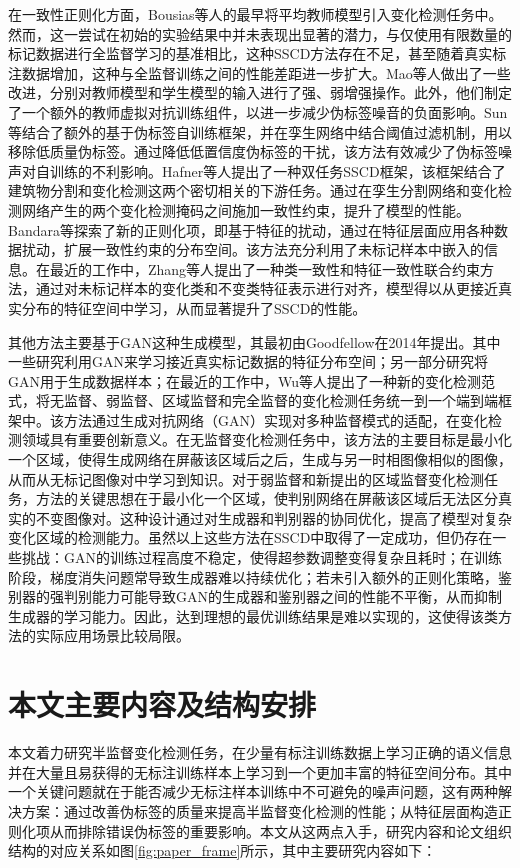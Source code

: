 \documentclass[lang=chs, degree=master, blindreview=false, adobe=false]{yanputhesis}
\begin{document}
在一致性正则化方面，Bousias等人\cite{bousias2021evaluation}的最早将平均教师模型引入变化检测任务中。然而，这一尝试在初始的实验结果中并未表现出显著的潜力，与仅使用有限数量的标记数据进行全监督学习的基准相比，这种SSCD方法存在不足，甚至随着真实标注数据增加，这种与全监督训练之间的性能差距进一步扩大。Mao等人\cite{mao2023semi}做出了一些改进，分别对教师模型和学生模型的输入进行了强、弱增强操作。此外，他们制定了一个额外的教师虚拟对抗训练组件，以进一步减少伪标签噪音的负面影响。Sun等\cite{sun2022semisanet}结合了额外的基于伪标签自训练框架，并在孪生网络中结合阈值过滤机制，用以移除低质量伪标签。通过降低低置信度伪标签的干扰，该方法有效减少了伪标签噪声对自训练的不利影响。Hafner等人\cite{hafner2022urban}提出了一种双任务SSCD框架，该框架结合了建筑物分割和变化检测这两个密切相关的下游任务。通过在孪生分割网络和变化检测网络产生的两个变化检测掩码之间施加一致性约束，提升了模型的性能。Bandara等\cite{bandara2022RCR}探索了新的正则化项，即基于特征的扰动，通过在特征层面应用各种数据扰动，扩展一致性约束的分布空间。该方法充分利用了未标记样本中嵌入的信息。在最近的工作中，Zhang等人\cite{Zhang2023FPA}提出了一种类一致性和特征一致性联合约束方法，通过对未标记样本的变化类和不变类特征表示进行对齐，模型得以从更接近真实分布的特征空间中学习，从而显著提升了SSCD的性能。

其他方法主要基于GAN这种生成模型，其最初由Goodfellow在2014年提出\cite{goodfellow2014gan}。其中一些研究利用GAN来学习接近真实标记数据的特征分布空间\cite{peng2021SemiCDNet}\cite{graph2019gan}\cite{nie2022semigan}\cite{yang2022gan}；另一部分研究将GAN用于生成数据样本\cite{li2023multi}\cite{gen_sample_TGRS21}；在最近的工作中，Wu等人\cite{wu2023fcdgan}提出了一种新的变化检测范式，将无监督、弱监督、区域监督和完全监督的变化检测任务统一到一个端到端框架中。该方法通过生成对抗网络（GAN）实现对多种监督模式的适配，在变化检测领域具有重要创新意义。在无监督变化检测任务中，该方法的主要目标是最小化一个区域，使得生成网络在屏蔽该区域后之后，生成与另一时相图像相似的图像，从而从无标记图像对中学习到知识。对于弱监督和新提出的区域监督变化检测任务，方法的关键思想在于最小化一个区域，使判别网络在屏蔽该区域后无法区分真实的不变图像对。这种设计通过对生成器和判别器的协同优化，提高了模型对复杂变化区域的检测能力。虽然以上这些方法在SSCD中取得了一定成功，但仍存在一些挑战：GAN的训练过程高度不稳定，使得超参数调整变得复杂且耗时；在训练阶段，梯度消失问题常导致生成器难以持续优化；若未引入额外的正则化策略，鉴别器的强判别能力可能导致GAN的生成器和鉴别器之间的性能不平衡，从而抑制生成器的学习能力。因此，达到理想的最优训练结果是难以实现的，这使得该类方法的实际应用场景比较局限。
\section{本文主要内容及结构安排}
本文着力研究半监督变化检测任务，在少量有标注训练数据上学习正确的语义信息并在大量且易获得的无标注训练样本上学习到一个更加丰富的特征空间分布。其中一个关键问题就在于能否减少无标注样本训练中不可避免的噪声问题，这有两种解决方案：通过改善伪标签的质量来提高半监督变化检测的性能；从特征层面构造正则化项从而排除错误伪标签的重要影响。本文从这两点入手，研究内容和论文组织结构的对应关系如图\ref{fig:paper_frame}所示，其中主要研究内容如下：
\end{document}
